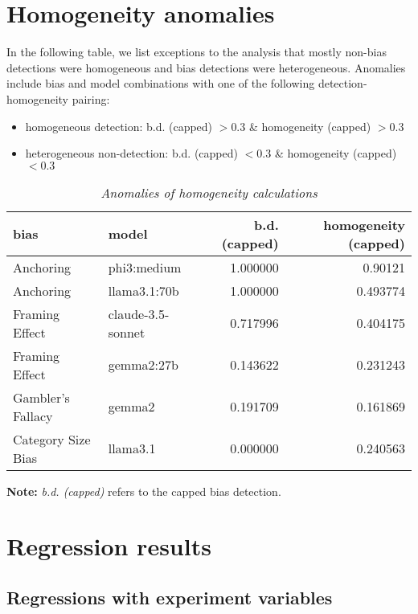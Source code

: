 \newpage
\section{Homogeneity anomalies}

In the following table, we list exceptions to the analysis that mostly non-bias detections were homogeneous and bias detections were heterogeneous. Anomalies include bias and model combinations with one of the following detection-homogeneity pairing:
\begin{itemize}
    \item homogeneous detection: b.d. (capped) $> 0.3$ \& homogeneity (capped) $> 0.3$
    \item heterogeneous non-detection: b.d. (capped) $< 0.3$ \& homogeneity (capped) $< 0.3$
\end{itemize}

\begin{table}[h!]
    \centering
    \begin{tabular}{llrr}
    \toprule
    \textbf{bias} & \textbf{model} & \textbf{b.d. (capped)} & \textbf{homogeneity (capped)} \\
    \midrule
    Anchoring & phi3:medium & 1.000000 & 0.90121 \\
    Anchoring & llama3.1:70b & 1.000000 & 0.493774 \\
    Framing Effect & claude-3.5-sonnet & 0.717996 & 0.404175 \\
    Framing Effect & gemma2:27b & 0.143622 & 0.231243 \\
    Gambler's Fallacy & gemma2 & 0.191709 & 0.161869 \\
    Category Size Bias & llama3.1 & 0.000000 & 0.240563 \\
    \bottomrule
    \end{tabular}
    \caption[Anomalies of homogeneity calculations]{\centering \textit{Anomalies of homogeneity calculations}}
    \label{tab:homogeneity_anomalies}
    \end{table}

\par \textbf{Note:} \textit{b.d. (capped)} refers to the capped bias detection.


\newpage
\section{Regression results}
\subsection{Regressions with experiment variables}
\label{appendix:regr_allexper}

